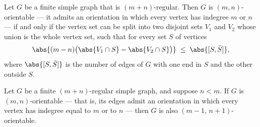 \begin{theorem}
\label{Networks.isOrientable_iff_exists_partition}
\leanok
{}
Let $G$ be a finite simple graph that is $(m+n)$-regular. Then $G$ is $(m,n)$-orientable
— it admits an orientation in which every vertex has indegree $m$ or $n$ — if and only
if the vertex set can be split into two disjoint sets $V_1$ and $V_2$ whose union is the
whole vertex set, such that for every set $S$ of vertices
\[
\abs{(m-n)\bigl(\abs{V_1\cap S}-\abs{V_2\cap S}\bigr)}\;\le\;\abs{[S,\bar S]},
\]
where $\abs{[S,\bar S]}$ is the number of edges of $G$ with one end in $S$ and the other
outside $S$.
\end{theorem}

\begin{theorem}
\label{Networks.isOrientable_pred_succ}
\leanok
{}
Let $G$ be a finite $(m+n)$-regular simple graph, and suppose $n < m$. If $G$ is
$(m,n)$-orientable — that is, its edges admit an orientation in which every vertex has
indegree equal to $m$ or to $n$ — then $G$ is also $(m-1,\,n+1)$-orientable.
\end{theorem}
